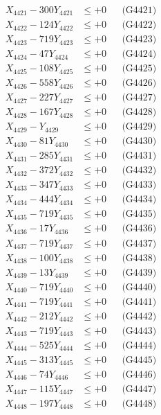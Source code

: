 \documentclass[a4paper,10pt]{article}
\begin{document}
{\begin{align}
\allowbreak
X_{4421} - 300Y_{4421} &\leq +0 && \text{(G4421)} \\
X_{4422} - 124Y_{4422} &\leq +0 && \text{(G4422)} \\
X_{4423} - 719Y_{4423} &\leq +0 && \text{(G4423)} \\
X_{4424} - 47Y_{4424} &\leq +0 && \text{(G4424)} \\
X_{4425} - 108Y_{4425} &\leq +0 && \text{(G4425)} \\
X_{4426} - 558Y_{4426} &\leq +0 && \text{(G4426)} \\
X_{4427} - 227Y_{4427} &\leq +0 && \text{(G4427)} \\
X_{4428} - 167Y_{4428} &\leq +0 && \text{(G4428)} \\
X_{4429} - Y_{4429} &\leq +0 && \text{(G4429)} \\
X_{4430} - 81Y_{4430} &\leq +0 && \text{(G4430)} \\
\allowbreak
X_{4431} - 285Y_{4431} &\leq +0 && \text{(G4431)} \\
X_{4432} - 372Y_{4432} &\leq +0 && \text{(G4432)} \\
X_{4433} - 347Y_{4433} &\leq +0 && \text{(G4433)} \\
X_{4434} - 444Y_{4434} &\leq +0 && \text{(G4434)} \\
X_{4435} - 719Y_{4435} &\leq +0 && \text{(G4435)} \\
X_{4436} - 17Y_{4436} &\leq +0 && \text{(G4436)} \\
X_{4437} - 719Y_{4437} &\leq +0 && \text{(G4437)} \\
X_{4438} - 100Y_{4438} &\leq +0 && \text{(G4438)} \\
X_{4439} - 13Y_{4439} &\leq +0 && \text{(G4439)} \\
X_{4440} - 719Y_{4440} &\leq +0 && \text{(G4440)} \\
\allowbreak
X_{4441} - 719Y_{4441} &\leq +0 && \text{(G4441)} \\
X_{4442} - 212Y_{4442} &\leq +0 && \text{(G4442)} \\
X_{4443} - 719Y_{4443} &\leq +0 && \text{(G4443)} \\
X_{4444} - 525Y_{4444} &\leq +0 && \text{(G4444)} \\
X_{4445} - 313Y_{4445} &\leq +0 && \text{(G4445)} \\
X_{4446} - 74Y_{4446} &\leq +0 && \text{(G4446)} \\
X_{4447} - 115Y_{4447} &\leq +0 && \text{(G4447)} \\
X_{4448} - 197Y_{4448} &\leq +0 && \text{(G4448)} \\

\end{align}}
\end{document}
